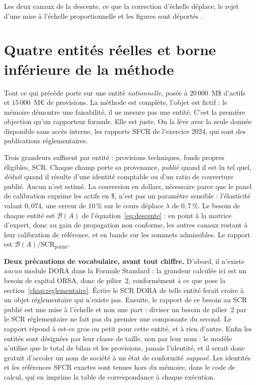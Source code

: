 Les deux canaux de la descente, ce que la correction d'échelle déplace, le rejet d'une mise à
l'échelle proportionnelle et les figures sont déportés \matcomp.

\section{Quatre entités réelles et borne inférieure de la méthode}

Tout ce qui précède porte sur une entité \emph{notionnelle}, posée à $20\,000$~M\$ d'actifs et
$15\,000$~M\euro{} de provisions. La méthode est complète, l'objet est fictif : le mémoire
démontre une faisabilité, il ne mesure pas une entité. C'est la première objection qu'un
rapporteur formule. Elle est juste. On la lève avec la seule donnée disponible sans accès
interne, les rapports SFCR de l'exercice 2024, qui sont des publications
réglementaires.

Trois grandeurs suffisent par entité : provisions techniques, fonds propres éligibles,
SCR. Chaque champ porte sa provenance, \emph{publié} quand il est lu tel quel,
\emph{déduit} quand il résulte d'une identité comptable ou d'un ratio de couverture publié.
Aucun n'est estimé. La conversion en dollars, nécessaire parce que le panel de calibration
exprime les actifs en \$, n'est pas un paramètre sensible : l'élasticité valant $0{,}074$, une
erreur de $10\,\%$ sur le cours déplace $\lambda$ de $0{,}7\,\%$. Le besoin de chaque entité est
$\mathcal{B}(A)$ de l'équation~\eqref{eq:descente} : en point à la matrice d'expert, donc au gain
de propagation non conforme, les autres canaux restant à leur calibration de référence, et en
bande sur les sommets admissibles. Le rapport est $\mathcal{B}(A)/\mathrm{SCR}_{\text{publié}}$.

\begin{attention}
\textbf{Deux précautions de vocabulaire, avant tout chiffre.} D'abord, il n'existe \emph{aucun}
module DORA dans la Formule Standard : la grandeur calculée ici est un besoin de
capital ORSA, donc de pilier~2, conformément à ce que pose la
section~\ref{chap:reglementaire}. Écrire \og le SCR DORA de telle entité\fg{} ferait
croire à un objet réglementaire qui n'existe pas. Ensuite, le rapport de ce besoin au SCR
publié est une mise à l'échelle et non une part : diviser un besoin de pilier~2 par le
SCR réglementaire ne fait pas du premier une composante du second. Le rapport répond à
\og est-ce gros ou petit pour cette entité\fg{}, et à rien d'autre. Enfin les entités sont désignées
par leur classe de taille, non par leur nom : le modèle n'utilise que le total de bilan et les
provisions, jamais l'identité, et il serait donc gratuit d'accoler un nom de société à un état de
conformité \emph{supposé}. Les identités et les références SFCR exactes sont tenues hors
du mémoire, dans le code de calcul, qui en imprime la table de correspondance à chaque exécution.
\end{attention}

